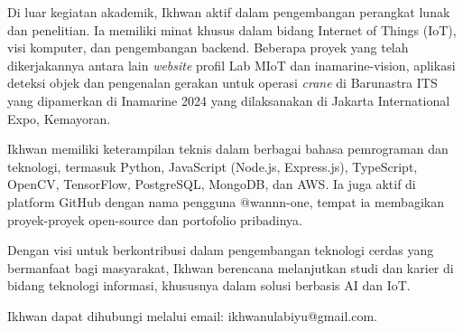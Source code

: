 Di luar kegiatan akademik, Ikhwan aktif dalam pengembangan perangkat lunak dan penelitian. Ia memiliki minat khusus dalam bidang Internet of Things (IoT), visi komputer, dan pengembangan backend. Beberapa proyek yang telah dikerjakannya antara lain \emph{website} profil Lab MIoT dan inamarine-vision, aplikasi deteksi objek dan pengenalan gerakan untuk operasi \emph{crane} di Barunastra ITS yang dipamerkan di Inamarine 2024 yang dilaksanakan di Jakarta International Expo, Kemayoran.

Ikhwan memiliki keterampilan teknis dalam berbagai bahasa pemrograman dan teknologi, termasuk Python, JavaScript (Node.js, Express.js), TypeScript, OpenCV, TensorFlow, PostgreSQL, MongoDB, dan AWS. Ia juga aktif di platform GitHub dengan nama pengguna @wannn-one, tempat ia membagikan proyek-proyek open-source dan portofolio pribadinya.

Dengan visi untuk berkontribusi dalam pengembangan teknologi cerdas yang bermanfaat bagi masyarakat, Ikhwan berencana melanjutkan studi dan karier di bidang teknologi informasi, khususnya dalam solusi berbasis AI dan IoT.

Ikhwan dapat dihubungi melalui email: ikhwanulabiyu@gmail.com.